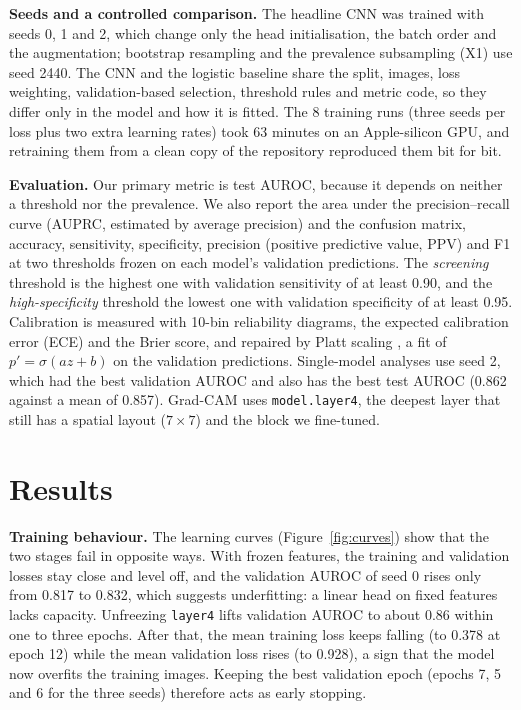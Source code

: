 \documentclass[11pt,a4paper]{article}
\begin{document}
\textbf{Seeds and a controlled comparison.} The headline CNN was trained with seeds 0, 1 and 2, which change only the head
initialisation, the batch order and the augmentation; bootstrap resampling and the prevalence subsampling (X1) use seed 2440. The CNN
and the logistic baseline share the split, images, loss weighting, validation-based selection, threshold rules and metric
code, so they differ only in the model and how it is fitted. The 8 training runs (three seeds per loss plus two extra learning rates) took 63 minutes on an Apple-silicon GPU,
and retraining them from a clean copy of the repository reproduced them bit for bit.

\textbf{Evaluation.} Our primary metric is test AUROC, because it depends on neither a threshold nor the prevalence. We also report the area under the precision--recall curve (AUPRC, estimated by average precision) and the confusion matrix, accuracy, sensitivity, specificity, precision (positive predictive value, PPV) and F1 at two thresholds frozen on each model's validation predictions. The \emph{screening} threshold is the highest one with validation sensitivity of
at least 0.90, and the \emph{high-specificity} threshold the lowest one with validation specificity of at least 0.95.
Calibration is measured with 10-bin reliability diagrams, the expected calibration error (ECE) and the Brier score, and
repaired by Platt scaling \cite{platt1999}, a fit of $p' = \sigma(a z + b)$ on the validation predictions. Single-model
analyses use seed 2, which had the best validation AUROC and also has the best test AUROC (0.862 against a mean of 0.857).
Grad-CAM \cite{selvaraju2017} uses \texttt{model.layer4}, the deepest layer that still has a spatial layout ($7\times7$) and the block we fine-tuned.

\section{Results}

\textbf{Training behaviour.} The learning curves (Figure~\ref{fig:curves}) show that the two stages fail in opposite
ways. With frozen features, the training and validation losses stay close and level off, and the validation AUROC of seed 0
rises only from 0.817 to 0.832, which suggests underfitting: a linear head on fixed features lacks capacity. Unfreezing
\texttt{layer4} lifts validation AUROC to about 0.86 within one to three epochs. After that, the mean training loss keeps
falling (to 0.378 at epoch 12) while the mean validation loss rises (to 0.928), a sign that the model now overfits the training images. Keeping the best validation epoch (epochs 7, 5 and 6 for the three seeds) therefore acts as
early stopping.
\end{document}
